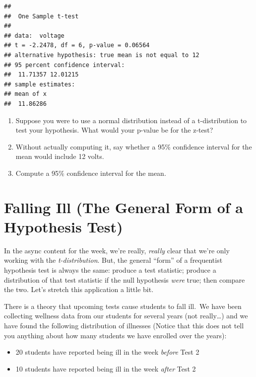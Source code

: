 \documentclass[
]{book}
\theoremstyle{definition}
\theoremstyle{definition}
\theoremstyle{definition}
\theoremstyle{definition}
\theoremstyle{remark}
\begin{document}
\begin{verbatim}
## 
##  One Sample t-test
## 
## data:  voltage
## t = -2.2478, df = 6, p-value = 0.06564
## alternative hypothesis: true mean is not equal to 12
## 95 percent confidence interval:
##  11.71357 12.01215
## sample estimates:
## mean of x 
##  11.86286
\end{verbatim}

\begin{enumerate}
\def\labelenumi{\arabic{enumi}.}
\setcounter{enumi}{5}
\item
  Suppose you were to use a normal distribution instead of a t-distribution to test your hypothesis. What would your p-value be for the z-test?
\item
  Without actually computing it, say whether a 95\% confidence interval for the mean would include 12 volts.
\item
  Compute a 95\% confidence interval for the mean.
\end{enumerate}

\hypertarget{falling-ill-the-general-form-of-a-hypothesis-test}{%
\section{Falling Ill (The General Form of a Hypothesis Test)}\label{falling-ill-the-general-form-of-a-hypothesis-test}}

In the async content for the week, we're really, \emph{really} clear that we're only working with the \emph{t-distribution}. But, the general ``form'' of a frequentist hypothesis test is always the same: produce a test statistic; produce a distribution of that test statistic if the null hypothesis \emph{were} true; then compare the two. Let's stretch this application a little bit.

There is a theory that upcoming tests cause students to fall ill.~We have been collecting wellness data from our students for several years (not really\ldots) and we have found the following distribution of illnesses (Notice that this does not tell you anything about how many students we have enrolled over the years):

\begin{itemize}
\item
  20 students have reported being ill in the week \emph{before} Test 2
\item
  10 students have reported being ill in the week \emph{after} Test 2
\end{itemize}
\end{document}

